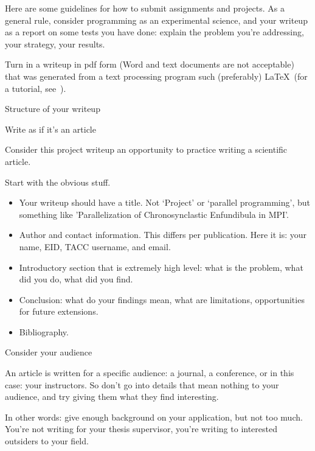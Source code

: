 
Here are some guidelines for how to submit assignments and projects.
As a general rule, consider programming as an experimental science,
and your writeup as a report on some tests you have done: explain
the problem you're addressing, your strategy, your results.

Turn in a writeup in pdf form (Word and text documents are not acceptable)
that was generated from a text processing program such 
(preferably) \LaTeX\ (for a tutorial, see~).

 {Structure of your writeup}

 {Write as if it's an article}

Consider this project writeup an opportunity to practice writing a scientific article.

Start with the obvious stuff.
\begin{itemize}
\item Your writeup should have a title. Not `Project' or `parallel programming',
  but something like 'Parallelization of Chronosynclastic Enfundibula in MPI'.
\item Author and contact information. This differs per publication.
  Here it is: your name, EID, TACC username, and email.
\item Introductory section that is extremely high level: what is the problem,
  what did you do, what did you find.
\item Conclusion: what do your findings mean, what are limitations, opportunities
  for future extensions.
\item Bibliography.
\end{itemize}

 {Consider your audience}

An article is written for a specific audience: a journal,  a conference,
or in this case: your instructors.
So don't go into details that mean nothing to your audience, and
try giving them what they find interesting.

In other words: give enough background on your application, but not too much.
You're not writing for your thesis supervisor, you're writing to
interested outsiders to your field.

